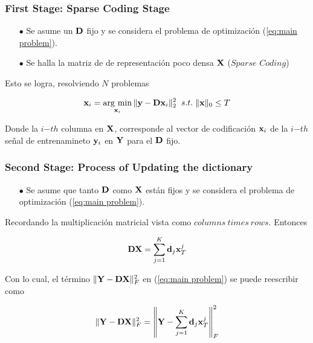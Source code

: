 \documentclass[spanish,xcolor=dvipsnames]{beamer}
\DeclareMathOperator*{\argmin}{arg\ min}
\begin{document}
\begin {frame}
	\frametitle{First Stage: Sparse Coding Stage}

	\begin{itemize}
		\item[\color {black} \bf $\bullet$] Se asume un ${\bf D}$ fijo y se considera el problema de optimización (\ref{eq:main problem}).
		\item[\color {black} \bf $\bullet$] Se halla la matriz de de representación poco densa ${\bf X}$ ($Sparse$  $Coding$)  %
	\end{itemize}
Esto se logra, resolviendo $N$ problemas

	\begin{equation}
		\nonumber {\bf x}_i=\argmin_{{\bf x}_i}\|{\bf y}-{\bf Dx}_i\|_2^2 \; \; s.t. \; \|{\bf x}\|_0 \leq T
	\end{equation}
		
Donde la $i$$-$$th$ columna en ${\bf X}$, corresponde al vector de codificación ${\bf x}_i$ de la $i$$-$$th$ señal de entrenamineto ${\bf y}_i$ en ${\bf Y}$ para el ${\bf D}$ fijo. \newline 

\end {frame} 

\begin {frame}
	\frametitle{Second Stage: Process of Updating the dictionary}

	\begin{itemize}
		\item[\color {black} \bf $\bullet$] Se asume que tanto ${\bf D}$ como ${\bf X}$ están fijos y se considera el problema de optimización (\ref{eq:main problem}).
	\end{itemize} 

 Recordando la multiplicación matricial vista como $columns \ times \  rows$. Entonces

	\begin{equation}
		\nonumber {\bf DX} = \sum_{j=1}^K {\bf d}_j {\bf x}_T^j
	\end{equation}
	
 Con lo cual, el término $\| {\bf Y} - {\bf DX} \|_F^2$ en (\ref{eq:main problem}) se puede reescribir como
	
	\begin{equation} \label{eq:auxiliar}
		\| {\bf Y} - {\bf DX} \|_F^2 = \left\| {\bf Y} - \sum_{j=1}^K {\bf d}_j {\bf x}_T^j  \right\|_F^2
	\end{equation}
	
\end {frame}
\end{document}
